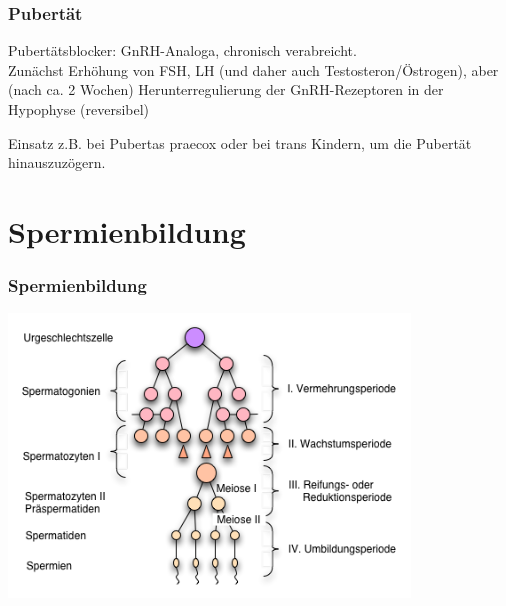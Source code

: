 \documentclass{beamer}
\begin{document}
\begin{frame}

\frametitle{Pubertät}



\begin{block}{Pubertätsblocker:} 
GnRH-Analoga, chronisch verabreicht. \\

Zunächst Erhöhung von FSH, LH (und daher auch Testosteron/Östrogen), aber (nach ca. 2 Wochen) Herunterregulierung der GnRH-Rezeptoren in der Hypophyse (reversibel)


Einsatz z.B. bei Pubertas praecox oder bei trans Kindern, um die Pubertät hinauszuzögern.

\end{block}

\end{frame}



 \section{Spermienbildung}


\begin{frame}
\frametitle{Spermienbildung}



\begin{center}
\includegraphics[width=0.8\textwidth]{Spermatogenese.png}
\end{center}

\end{frame}
\end{document}
